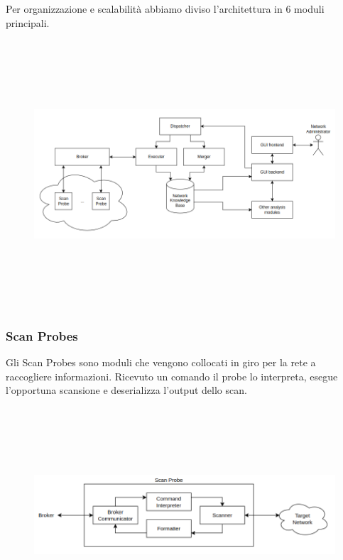 \documentclass[target=bach,aauheader=,style=]{thud}
\begin{document}
\FloatBarrier

Per organizzazione e scalabilità abbiamo diviso l'architettura in 6 moduli principali.


\begin{figure}[h]
  \includegraphics[width=15cm, height=10cm]{moduli_new}
  \centering
\end{figure}

\FloatBarrier

\subsubsection{Scan Probes}
Gli Scan Probes sono moduli che vengono collocati in giro per la rete a raccogliere informazioni. 
Ricevuto un comando il probe lo interpreta, esegue l'opportuna scansione e deserializza l'output dello scan.


\begin{figure}[h]
  \includegraphics[width=14cm, height=8cm]{probe}
  \centering
\end{figure}
\FloatBarrier
\end{document}

